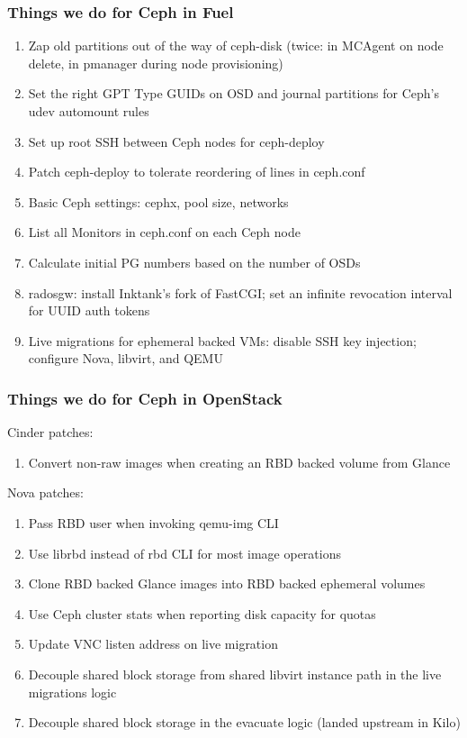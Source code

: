 \documentclass[hyperref=unicode,utf8,xcolor=pst,aspectratio=169]{beamer}
\begin{document}
\begin{frame}
	\frametitle{Things we do for Ceph in Fuel}
	\begin{enumerate}
		\item Zap old partitions out of the way of ceph-disk (twice: in
			MCAgent on node delete, in pmanager during node
			provisioning)
		\item Set the right GPT Type GUIDs on OSD and journal
			partitions for Ceph's udev automount rules
		\item Set up root SSH between Ceph nodes for ceph-deploy
		\item Patch ceph-deploy to tolerate reordering of lines in
			ceph.conf
		\item Basic Ceph settings: cephx, pool size, networks
		\item List all Monitors in ceph.conf on each Ceph node
		\item Calculate initial PG numbers based on the number of OSDs
		\item radosgw: install Inktank's fork of FastCGI; set an
			infinite revocation interval for UUID auth tokens
		\item Live migrations for ephemeral backed VMs: disable SSH key
			injection; configure Nova, libvirt, and QEMU
	\end{enumerate}
\end{frame}

\begin{frame}
	\frametitle{Things we do for Ceph in OpenStack}
	Cinder patches:
	\begin{enumerate}
		\item Convert non-raw images when creating an
			RBD backed volume from Glance
	\end{enumerate}

	Nova patches:
	\begin{enumerate}
		\item Pass RBD user when invoking qemu-img CLI
		\item Use librbd instead of rbd CLI for most
			image operations
		\item Clone RBD backed Glance images into RBD
			backed ephemeral volumes
		\item Use Ceph cluster stats when reporting
			disk capacity for quotas
		\item Update VNC listen address on live migration
		\item Decouple shared block storage from shared libvirt
			instance path in the live migrations logic
		\item Decouple shared block storage in the evacuate logic
			(landed upstream in Kilo)
	\end{enumerate}
\end{frame}
\end{document}
